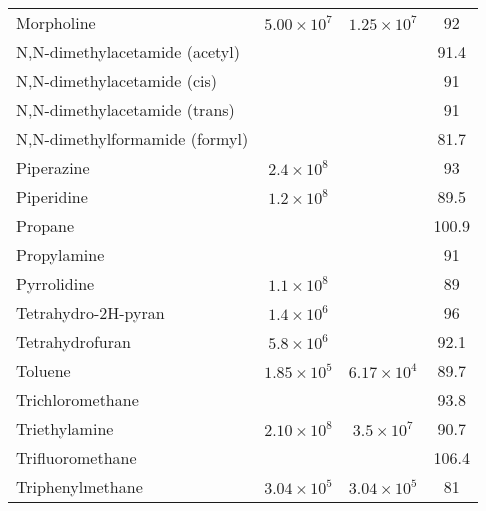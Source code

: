 \begin{longtable}{l | c c c}
 Morpholine                     & $ 5.00 \times 10^7$ & $1.25 \times 10^7 $ &        92 \\
 N,N-dimethylacetamide (acetyl) &                &                &      91.4 \\
 N,N-dimethylacetamide (cis)    &                &                &        91 \\
 N,N-dimethylacetamide (trans)  &                &                &        91 \\
 N,N-dimethylformamide (formyl) &                &                &      81.7 \\
 Piperazine                     & $ 2.4 \times 10^8 $ &                &        93 \\
 Piperidine                     & $ 1.2 \times 10^8 $ &                &      89.5 \\
 Propane                        &                &                &     100.9 \\
 Propylamine                    &                &                &        91 \\
 Pyrrolidine                    & $ 1.1 \times 10^8 $ &                &        89 \\
 Tetrahydro-2H-pyran            & $ 1.4 \times 10^6 $ &                &        96 \\
 Tetrahydrofuran                & $ 5.8 \times 10^6 $ &                &      92.1 \\
 Toluene                        & $ 1.85 \times 10^5$ & $6.17 \times 10^4 $ &      89.7 \\
 Trichloromethane               &                &                &      93.8 \\
 Triethylamine                  & $ 2.10 \times 10^8$ & $3.5 \times 10^7  $ &      90.7 \\
 Trifluoromethane               &                &                &     106.4 \\
 Triphenylmethane               & $ 3.04 \times 10^5$ & $3.04 \times 10^5 $ &        81 \\
\end{longtable}

